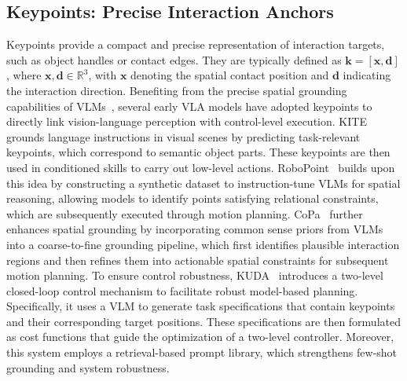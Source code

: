 \documentclass[10pt, a4paper, logo, copyright]{googledeepmind} %
\begin{document}
\subsection{Keypoints: Precise Interaction Anchors}
Keypoints provide a compact and precise representation of interaction targets, such as object handles or contact edges. They are typically defined as $\mathbf{k} = [\mathbf{x}, \mathbf{d}]$, where $\mathbf{x}, \mathbf{d} \in \mathbb{R}^3$, with $\mathbf{x}$ denoting the spatial contact position and $\mathbf{d}$ indicating the interaction direction. Benefiting from the precise spatial grounding capabilities of VLMs~\cite{oquab2023dinov2, kirillov2023segment, CLIP, deitke2024molmo, team2025gemini}, several early VLA models have adopted keypoints to directly link vision-language perception with control-level execution. KITE~\cite{sundaresankite} grounds language instructions in visual scenes by predicting task-relevant keypoints, which correspond to semantic object parts. These keypoints are then used in conditioned skills to carry out low-level actions. RoboPoint~\cite{yuanrobopoint} builds upon this idea by constructing a synthetic dataset to instruction-tune VLMs for spatial reasoning, allowing models to identify points satisfying relational constraints, which are subsequently executed through motion planning. CoPa~\cite{huang2024copa} further enhances spatial grounding by incorporating common sense priors from VLMs into a coarse-to-fine grounding pipeline, which first identifies plausible interaction regions and then refines them into actionable spatial constraints for subsequent motion planning. To ensure control robustness, KUDA~\cite{liu2025kuda} introduces a two-level closed-loop control mechanism to facilitate robust model-based planning. Specifically, it uses a VLM to generate task specifications that contain keypoints and their corresponding target positions. These specifications are then formulated as cost functions that guide the optimization of a two-level controller. Moreover, this system employs a retrieval-based prompt library, which strengthens few-shot grounding and system robustness.
\end{document}
